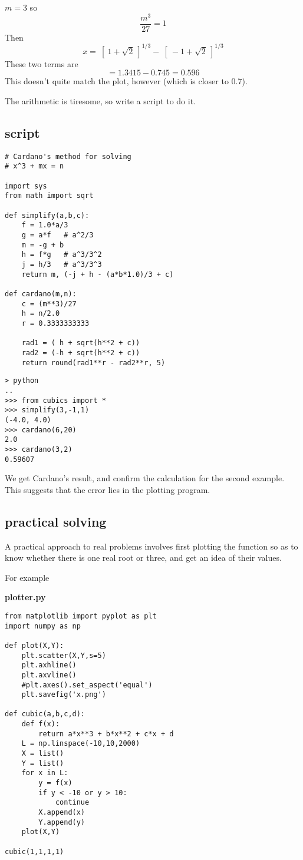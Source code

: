 \documentclass[11pt, oneside]{article}
\begin{document}
$m = 3$ so
\[ \frac{m^3}{27} = 1  \]
Then
\[ x = \ [ \ 1 + \sqrt{2} \ ]^{1/3} - \ [ \ -1 + \sqrt{2} \ ]^{1/3} \]
These two terms are 
\[ = 1.3415 - 0.745 = 0.596  \]
This doesn't quite match the plot, however (which is closer to 0.7).

The arithmetic is tiresome, so write a script to do it.

\subsection*{script}

\begin{verbatim}
# Cardano's method for solving
# x^3 + mx = n 

import sys
from math import sqrt

def simplify(a,b,c):
    f = 1.0*a/3
    g = a*f   # a^2/3
    m = -g + b
    h = f*g   # a^3/3^2
    j = h/3   # a^3/3^3
    return m, (-j + h - (a*b*1.0)/3 + c)

def cardano(m,n):
    c = (m**3)/27
    h = n/2.0
    r = 0.3333333333

    rad1 = ( h + sqrt(h**2 + c))
    rad2 = (-h + sqrt(h**2 + c))
    return round(rad1**r - rad2**r, 5)
\end{verbatim}

\begin{verbatim}
> python
..
>>> from cubics import *
>>> simplify(3,-1,1)
(-4.0, 4.0)
>>> cardano(6,20)
2.0
>>> cardano(3,2)
0.59607

\end{verbatim}

We get Cardano's result, and confirm the calculation for the second example.  This suggests that the error lies in the plotting program.

\subsection*{practical solving}

A practical approach to real problems involves first plotting the function so as to know whether there is one real root or three, and get an idea of their values.

For example

\textbf{plotter.py}

\begin{verbatim}
from matplotlib import pyplot as plt
import numpy as np

def plot(X,Y):
    plt.scatter(X,Y,s=5)
    plt.axhline()
    plt.axvline()
    #plt.axes().set_aspect('equal')
    plt.savefig('x.png')

def cubic(a,b,c,d):
    def f(x):
        return a*x**3 + b*x**2 + c*x + d
    L = np.linspace(-10,10,2000)
    X = list()
    Y = list()
    for x in L:
        y = f(x)
        if y < -10 or y > 10:
            continue 
        X.append(x)
        Y.append(y)
    plot(X,Y)

cubic(1,1,1,1)
\end{verbatim}
\end{document}
